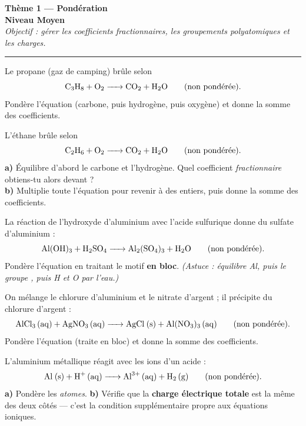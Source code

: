 \documentclass[11pt,a4paper]{article}
\begin{document}
\begin{center}
{\LARGE\bfseries\color{primarydark}Thème 1 — Pondération}\\[1pt]
{\large\color{moycol}\textbf{Niveau Moyen}}\\[2pt]
{\itshape Objectif : gérer les coefficients fractionnaires, les groupements polyatomiques et les charges.}\\
{\color{primary}\rule{0.6\linewidth}{1pt}}
\end{center}

\begin{exo}
Le propane (gaz de camping) brûle selon
\[ \ce{C3H8 + O2 -> CO2 + H2O}\qquad\text{(non pondérée).} \]
Pondère l'équation (carbone, puis hydrogène, puis oxygène) et donne la somme des coefficients.
\end{exo}

\begin{exo}
L'éthane brûle selon
\[ \ce{C2H6 + O2 -> CO2 + H2O}\qquad\text{(non pondérée).} \]
\textbf{a)} Équilibre d'abord le carbone et l'hydrogène. Quel coefficient \emph{fractionnaire}
obtiens-tu alors devant  ?\\
\textbf{b)} Multiplie toute l'équation pour revenir à des entiers, puis donne la somme des coefficients.
\end{exo}

\begin{exo}
La réaction de l'hydroxyde d'aluminium avec l'acide sulfurique donne du sulfate d'aluminium :
\[ \ce{Al(OH)3 + H2SO4 -> Al2(SO4)3 + H2O}\qquad\text{(non pondérée).} \]
Pondère l'équation en traitant le motif  \textbf{en bloc}. \emph{(Astuce : équilibre Al,
puis le groupe , puis H et O par l'eau.)}
\end{exo}

\begin{exo}
On mélange le chlorure d'aluminium et le nitrate d'argent ; il précipite du chlorure d'argent :
\[ \ce{AlCl3 (aq) + AgNO3 (aq) -> AgCl (s) + Al(NO3)3 (aq)}\qquad\text{(non pondérée).} \]
Pondère l'équation (traite  en bloc) et donne la somme des coefficients.
\end{exo}

\begin{exo}
L'aluminium métallique réagit avec les ions  d'un acide :
\[ \ce{Al (s) + H+ (aq) -> Al^3+ (aq) + H2 (g)}\qquad\text{(non pondérée).} \]
\textbf{a)} Pondère les \emph{atomes}.\quad
\textbf{b)} Vérifie que la \textbf{charge électrique totale} est la même des deux côtés — c'est la
condition supplémentaire propre aux équations ioniques.
\end{exo}
\end{document}
